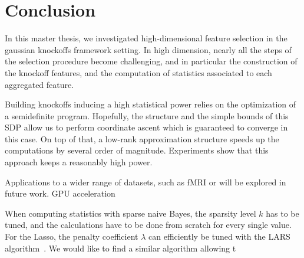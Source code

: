 \cleardoublepage
\chapter*{Conclusion}

In this master thesis,
we investigated high-dimensional feature selection
in the gaussian knockoffs framework setting.
In high dimension, nearly all the steps of the selection procedure become challenging,
and in particular the construction of the knockoff features,
and the computation of statistics associated to each aggregated feature.

Building knockoffs inducing a high statistical power relies on the optimization of a semidefinite program.
Hopefully, the structure and the simple bounds of this SDP allow us to perform coordinate ascent which
is guaranteed to converge in this case.
On top of that, a low-rank approximation structure speeds up the computations by several order of magnitude.
Experiments show that this approach keeps a reasonably high power.

Applications to a wider range of datasets, such as fMRI or will be explored in future work.
GPU acceleration

When computing statistics with sparse naive Bayes,
the sparsity level $k$ has to be tuned,
and the calculations have to be done from scratch for every single value.
For the Lasso, the penalty coefficient $\lambda$ can efficiently be tuned with the LARS algorithm~\cite{lars}.
We would like to find a similar algorithm allowing t
